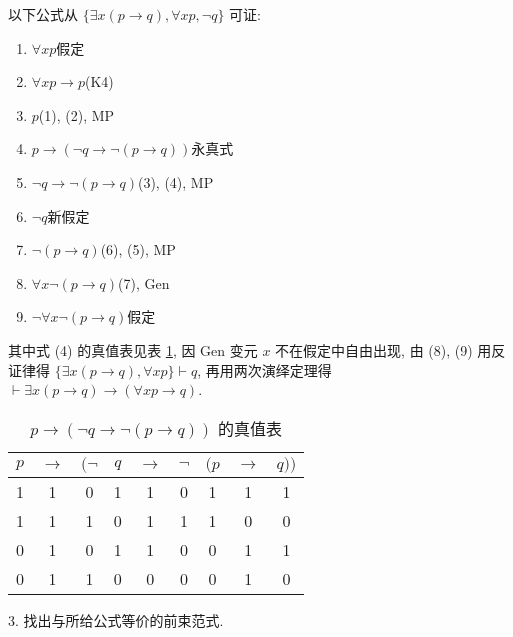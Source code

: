 \documentclass[boxes]{homework}
\begin{document}
\begin{solution}
    以下公式从 $\{\exists x(p\to q), \forall xp, \lnot q\}$ 可证:
    \begin{enumerate}[label = (\arabic*), parsep = 0pt, itemsep = 0pt, topsep = .25em]
        \item $\forall xp$\hfill 假定
        \item $\forall xp \to p$\hfill (K4)
        \item $p$\hfill (1), (2), MP
        \item $p\to (\lnot q\to \lnot (p\to q))$\hfill 永真式
        \item $\lnot q\to\lnot (p\to q)$\hfill (3), (4), MP
        \item $\lnot q$\hfill 新假定
        \item $\lnot (p\to q)$\hfill (6), (5), MP
        \item $\forall x\lnot (p\to q)$\hfill (7), Gen
        \item $\lnot \forall x\lnot (p\to q)$\hfill 假定
    \end{enumerate}
    其中式 (4) 的真值表见表 \ref{tab:16.1.2}, 因 Gen 变元 $x$ 不在假定中自由出现, 由 (8), (9) 用反证律得 $\{\exists x(p\to q), \forall xp\}\vdash q$, 再用两次演绎定理得 $\vdash \exists x(p\to q)\to (\forall xp\to q)$.
    \newpage
    \begin{table}[!htbp]
        \centering
        \caption{$p\to (\lnot q\to \lnot (p\to q))$ 的真值表}
        \label{tab:16.1.2}
        \begin{tabular}{c|c|ccccccc}
            $p$ & $\to$ & $(\lnot$ & $q$ & $\to$ & $\lnot$ & $(p$ & $\to$ & $q))$ \\
            \hline
            1 & 1 & 0 & 1 & 1 & 0 & 1 & 1 & 1\\
            1 & 1 & 1 & 0 & 1 & 1 & 1 & 0 & 0\\
            0 & 1 & 0 & 1 & 1 & 0 & 0 & 1 & 1\\
            0 & 1 & 1 & 0 & 0 & 0 & 0 & 1 & 0\\ 
        \end{tabular}
    \end{table}
\end{solution}
\begin{problem}
    3. 找出与所给公式等价的前束范式.
\end{problem}
\end{document}
